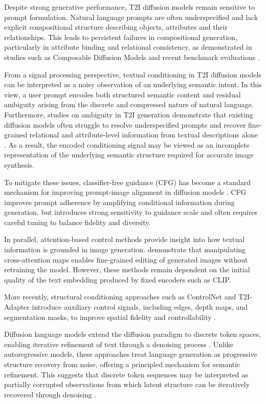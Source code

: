 \documentclass[a4paper,twoside,12pt]{report}
\begin{document}
Despite strong generative performance, T2I diffusion models remain sensitive to prompt formulation. Natural language prompts are often underspecified and lack explicit compositional structure describing objects, attributes and their relationships. This leads to persistent failures in compositional generation, particularly in attribute binding and relational consistency, as demonstrated in studies such as Composable Diffusion Models \citep{liu2022composable} and recent benchmark evaluations \citep{huang2023t2icompbench}.

From a signal processing perspective, textual conditioning in T2I diffusion models can be interpreted as a noisy observation of an underlying semantic intent. In this view, a user prompt encodes both structured semantic content and residual ambiguity arising from the discrete and compressed nature of natural language. Furthermore, studies on ambiguity in T2I generation demonstrate that existing diffusion models often struggle to resolve underspecified prompts and recover fine-grained relational and attribute-level information from textual descriptions alone \citep{huang2023t2icompbench, mehrabi2023ambiguities, elsharif2025ambiguity}. As a result, the encoded conditioning signal may be viewed as an incomplete representation of the underlying semantic structure required for accurate image synthesis.

To mitigate these issues, classifier-free guidance (CFG) has become a standard mechanism for improving prompt-image alignment in diffusion models \citep{ho2022cfg}. CFG improves prompt adherence by amplifying conditional information during generation, but introduces strong sensitivity to guidance scale and often requires careful tuning to balance fidelity and diversity.

In parallel, attention-based control methods provide insight into how textual information is grounded in image generation.  \cite{hertz2022prompt} demonstrate that manipulating cross-attention maps enables fine-grained editing of generated images without retraining the model. However, these methods remain dependent on the initial quality of the text embedding produced by fixed encoders such as CLIP.

More recently, structural conditioning approaches such as ControlNet and T2I-Adapter introduce auxiliary control signals, including edges, depth maps, and segmentation masks, to improve spatial fidelity and controllability \citep{zhang2023controlnet, mou2023t2iadapter}.

Diffusion language models extend the diffusion paradigm to discrete token spaces, enabling iterative refinement of text through a denoising process \citep{ li2022diffusionlm}. Unlike autoregressive models, these approaches treat language generation as progressive structure recovery from noise, offering a principled mechanism for semantic refinement. This suggests that discrete token sequences may be interpreted as partially corrupted observations from which latent structure can be iteratively recovered through denoising \citep{austin2021structured}.
\end{document}
